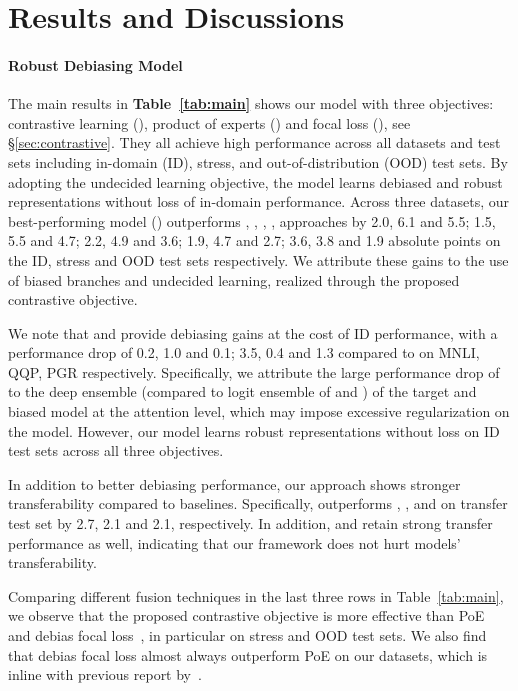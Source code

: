 \section{Results and Discussions}

\paragraph{Robust Debiasing Model}
The main results in \textbf{Table~\ref{tab:main}} shows our model with three objectives: contrastive learning (\OursCL), product of experts (\OursPoe) and focal loss (\OursFocal), see \S\ref{sec:contrastive}. They all achieve high performance across all datasets and test sets including in-domain (ID), stress, and out-of-distribution (OOD) test sets. By adopting the undecided learning objective, the model learns debiased and robust representations without loss of in-domain performance. 
Across three datasets, our best-performing model (\OursCL) outperforms \MASK, \KW, \ETE, \IE, \READ approaches by 2.0, 6.1 and 5.5; 1.5, 5.5 and 4.7; 2.2, 4.9 and 3.6; 1.9, 4.7 and 2.7; 3.6, 3.8 and 1.9 absolute points on the ID, stress and OOD test sets respectively. We attribute these gains to the use of biased branches and undecided learning, realized through the proposed contrastive objective. 

We note that \IE and \READ provide debiasing gains at the cost of ID performance, with a performance drop of 0.2, 1.0 and 0.1; 3.5, 0.4 and 1.3 compared to \FT on MNLI, QQP, PGR respectively. Specifically, we attribute the large performance drop of \READ to the deep ensemble (compared to logit ensemble of \ETE and \OursPoe) of the target and biased model at the attention level, which may impose excessive regularization on the model. However, our model learns robust representations without loss on ID test sets across all three objectives. 

In addition to better debiasing performance, our approach shows stronger transferability compared to baselines. Specifically, \OursCL outperforms \MASK, \KW, and \ETE on transfer test set by 2.7, 2.1 and 2.1, respectively. In addition, \OursPoe and \OursFocal retain strong transfer performance as well, indicating that our framework does not hurt models' transferability.


Comparing different fusion techniques in the last three rows in Table~\ref{tab:main}, we observe that the proposed contrastive objective is more effective than PoE~\citep{karimi-mahabadi-etal-2020-end,clark-etal-2019-dont,sanh2020learning} and debias focal loss~\citep{karimi-mahabadi-etal-2020-end}, in particular on stress and OOD test sets. We also find that debias focal loss almost always outperform PoE on our datasets, which is inline with previous report by~\citet{karimi-mahabadi-etal-2020-end}.
%



